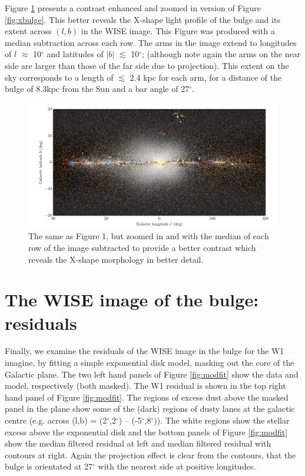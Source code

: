\documentclass[12pt, preprint]{aastex}
\begin{document}
Figure \ref{fig:filt} presents a contrast enhanced and zoomed in version of Figure \ref{fig:xbulge}. This better reveals the X-shape light profile of the bulge and its extent across $(l,b)$ in the WISE image. This Figure was produced with a median subtraction across each row. The arms in the image extend to longitudes of $l$ $\approx$ 10$^\circ$ and latitudes of $|b|$ $\lesssim$ 10$^\circ$; (although note again the arms on the near side are larger than those of the far side due to projection). This extent on the sky corresponds to a length of $\lesssim$ 2.4 kpc for each arm, for a distance of the bulge of 8.3kpc from the Sun and a bar angle of 27$^\circ$. 

\begin{figure}[h!]
\centering
        \includegraphics[width=\textwidth]{xbulge-01}
\caption{The same as Figure 1, but zoomed in and with the median of each row of the image subtracted to provide a better contrast which reveals the X-shape morphology in better detail.}
\label{fig:filt}
\end{figure}

\section{The WISE image of the bulge: residuals}

Finally, we examine the residuals of the WISE image in the bulge for the W1 imagine, by fitting a simple exponential disk model, masking out the core of the Galactic plane. The two left hand panels of Figure \ref{fig:modfit} show the data and model, respectively (both masked). The W1 residual is shown in the top right hand panel of Figure \ref{fig:modfit}. The regions of excess dust above the masked panel in the plane show some of the (dark)  regions of dusty lanes at the galactic centre (e.g. across (l,b) = (2$^\circ$,2$^\circ$) -- (-5$^\circ$,8$^\circ$)). The white regions show the stellar excess above the exponential disk and the bottom panels of Figure \ref{fig:modfit} show the median filtered residual at left and median filtered residual with contours at right. Again the projection effect is clear from the contours, that the bulge is orientated at 27$^\circ$ with the nearest side at  positive longitudes. %
\end{document}
